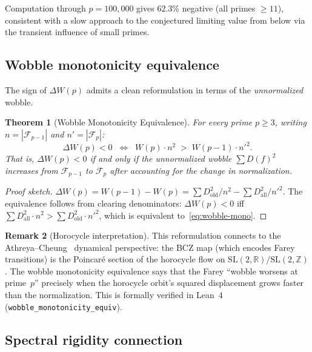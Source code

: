 \documentclass[11pt]{article}
\newtheorem{theorem}{Theorem}[section]
\theoremstyle{definition}
\newtheorem{remark}[theorem]{Remark}
\newcommand{\Z}{\mathbb{Z}}
\newcommand{\R}{\mathbb{R}}
\newcommand{\F}{\mathcal{F}}
\begin{document}
\noindent Computation through $p = 100{,}000$ gives $62.3\%$ negative
(all primes $\ge 11$), consistent with a slow approach to the
conjectured limiting value from below via the transient influence
of small primes.


\subsection{Wobble monotonicity equivalence}

The sign of $\Delta W(p)$ admits a clean reformulation in terms
of the \emph{unnormalized} wobble.

\begin{theorem}[Wobble Monotonicity Equivalence]\label{thm:wobble-mono}
For every prime $p \ge 3$, writing $n = |\F_{p-1}|$ and $n' = |\F_p|$:
\begin{equation}\label{eq:wobble-mono}
  \Delta W(p) < 0
  \;\;\Longleftrightarrow\;\;
  W(p) \cdot n^2 \;>\; W(p-1) \cdot {n'}^2.
\end{equation}
That is, $\Delta W(p) < 0$ if and only if the \emph{unnormalized}
wobble $\sum D(f)^2$ increases from $\F_{p-1}$ to $\F_p$
after accounting for the change in normalization.
\end{theorem}

\begin{proof}[Proof sketch]
$\Delta W(p) = W(p-1) - W(p) = \sum D^2_{\text{old}}/n^2 -
\sum D^2_{\text{all}}/{n'}^2$.  The equivalence follows from
clearing denominators: $\Delta W(p) < 0$ iff
$\sum D^2_{\text{all}} \cdot n^2 > \sum D^2_{\text{old}} \cdot {n'}^2$,
which is equivalent to~\eqref{eq:wobble-mono}.
\end{proof}

\begin{remark}[Horocycle interpretation]
This reformulation connects to the Athreya--Cheung~\cite{AthreyaCheung2014}
dynamical perspective: the BCZ map (which encodes Farey transitions)
is the Poincar\'e section of the horocycle flow on $\mathrm{SL}(2,\R)/\mathrm{SL}(2,\Z)$.
The wobble monotonicity equivalence says that the Farey
``wobble worsens at prime~$p$'' precisely when the horocycle
orbit's squared displacement grows faster than the normalization.
This is formally verified in Lean~4
(\texttt{wobble\_monotonicity\_equiv}).
\end{remark}

\subsection{Spectral rigidity connection}
\end{document}
